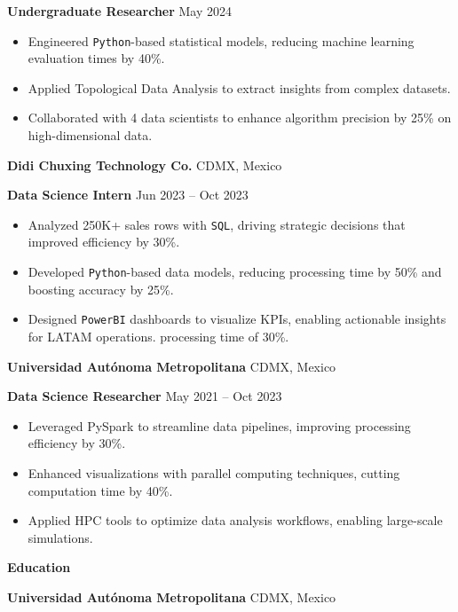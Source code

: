\documentclass[6pt]{article}
\begin{document}
\textbf{Undergraduate Researcher} \hfill May 2024
\begin{itemize}[noitemsep, topsep=0pt, partopsep=0pt, parsep=0pt]
    \item Engineered \texttt{Python}-based statistical models, reducing machine learning evaluation times by 40\%.
    \item Applied Topological Data Analysis to extract insights from complex datasets.
    \item Collaborated with 4 data scientists to enhance algorithm precision by 25\% on high-dimensional data.
\end{itemize}
\vspace{5pt}
\textbf{Didi Chuxing Technology Co.} \hfill CDMX, Mexico

\textbf{Data Science Intern} \hfill Jun 2023 – Oct 2023
\begin{itemize}[noitemsep, topsep=0pt, partopsep=0pt, parsep=0pt]
    \item Analyzed 250K+ sales rows with \texttt{SQL}, driving strategic decisions that improved efficiency by 30\%.
    \item Developed \texttt{Python}-based data models, reducing processing time by 50\% and boosting accuracy by 25\%.
    \item Designed \texttt{PowerBI} dashboards to visualize KPIs, enabling actionable insights for LATAM operations.
    processing time of 30\%.
\end{itemize}
\vspace{5pt}
\textbf{Universidad Autónoma Metropolitana} \hfill CDMX, Mexico

\textbf{Data Science Researcher} \hfill May 2021 – Oct 2023
\begin{itemize}[noitemsep, topsep=0pt, partopsep=0pt, parsep=0pt]
    \item Leveraged PySpark to streamline data pipelines, improving processing efficiency by 30\%.
    \item Enhanced visualizations with parallel computing techniques, cutting computation time by 40\%.
    \item Applied HPC tools to optimize data analysis workflows, enabling large-scale simulations.
\end{itemize}
\vspace{10pt}
\begin{center}
    \textbf{Education}
\end{center}
\textbf{Universidad Autónoma Metropolitana} \hfill CDMX, Mexico
\end{document}
